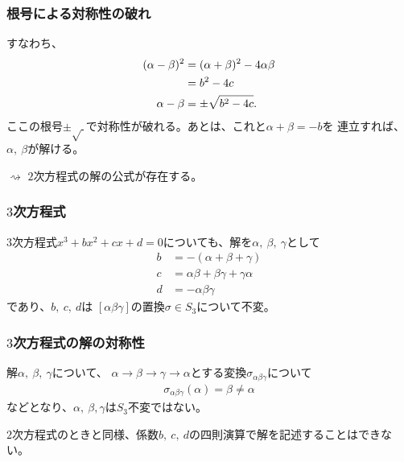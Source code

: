 \documentclass[12pt, t]{beamer}
\newcommand{\slr}[1]{\left[{}#1\right]{}}
\begin{document}
\begin{frame}
\frametitle{根号による対称性の破れ}
すなわち、
\begin{align}
  (\alpha - \beta)^2 &= (\alpha + \beta)^2 - 4 \alpha \beta \notag \\
                     &= b^2 - 4 c \\
  \alpha - \beta &= \pm \sqrt{b^2 - 4 c}.
\end{align}
ここの根号$\pm \sqrt{\ }$で\alert{対称性が破れる}。あとは、これと$\alpha + \beta = -b$を
連立すれば、$\alpha,\ \beta$が解ける。

$\rightsquigarrow$ $2$次方程式の解の公式が存在する。
\end{frame}

\begin{frame}
\frametitle{$3$次方程式}
$3$次方程式$x^3+bx^2+cx+d=0$についても、解を$\alpha,\ \beta,\ \gamma$として
\begin{align}
  b &= -(\alpha + \beta + \gamma) \\
  c &= \alpha \beta + \beta \gamma + \gamma \alpha \\
  d &= -\alpha \beta \gamma
\end{align}
であり、$b,\ c,\ d$は $\slr{\alpha \beta \gamma}$の置換$\sigma \in S_3$について不変。
\end{frame}

\begin{frame}
\frametitle{$3$次方程式の解の対称性}
解$\alpha,\ \beta,\ \gamma$について、
$\alpha \rightarrow \beta \rightarrow \gamma \rightarrow \alpha$とする変換$\sigma_{\alpha \beta \gamma}$について
\begin{align}
  \sigma_{\alpha \beta \gamma}(\alpha) = \beta \neq \alpha
\end{align}
などとなり、$\alpha,\ \beta, \gamma$は$S_3$不変ではない。

$2$次方程式のときと同様、係数$b,\ c,\ d$の四則演算で解を記述することはできない。
\end{frame}
\end{document}
